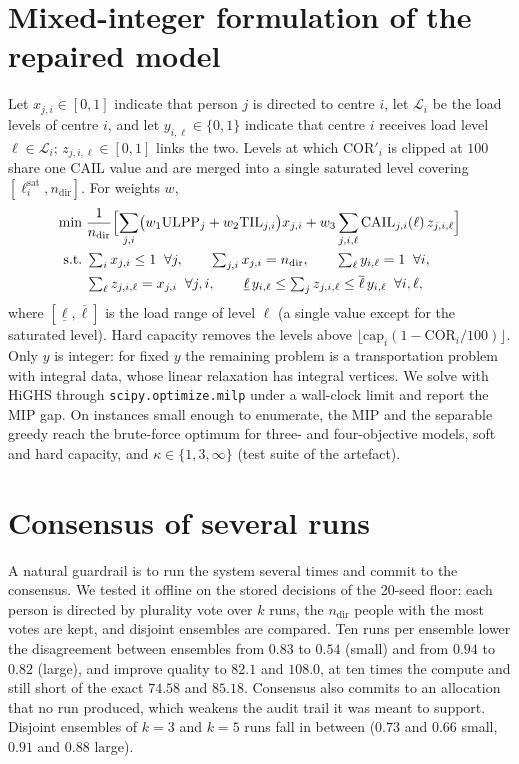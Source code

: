 \documentclass[systems,article,submit,moreauthors,pdftex]{Definitions/mdpi}
\begin{document}
\section{Mixed-integer formulation of the repaired model}\label{app:mip}
Let $x_{j,i} \in [0,1]$ indicate that person $j$ is directed to centre $i$, let
$\mathcal{L}_i$ be the load levels of centre $i$, and let $y_{i,\ell} \in \{0,1\}$ indicate
that centre $i$ receives load level $\ell \in \mathcal{L}_i$; $z_{j,i,\ell} \in [0,1]$ links
the two. Levels at which $\mathrm{COR}'_i$ is clipped at $100$ share one CAIL value and are
merged into a single saturated level covering $[\ell^{\mathrm{sat}}_i, n_{\mathrm{dir}}]$.
For weights $w$,
\begin{align}
\min\; & \frac{1}{n_{\mathrm{dir}}}\Bigl[\sum_{j,i} \bigl(w_1\mathrm{ULPP}_j + w_2\mathrm{TIL}_{j,i}\bigr)x_{j,i}
 + w_3 \sum_{j,i,\ell} \mathrm{CAIL}_{j,i}(\ell)\, z_{j,i,\ell}\Bigr] \\
\text{s.t.}\; & \textstyle\sum_i x_{j,i} \le 1 \;\; \forall j, \qquad \sum_{j,i} x_{j,i} = n_{\mathrm{dir}},
 \qquad \sum_{\ell} y_{i,\ell} = 1 \;\; \forall i,\\
& \textstyle\sum_{\ell} z_{j,i,\ell} = x_{j,i} \;\; \forall j,i, \qquad
 \underline{\ell}\, y_{i,\ell} \le \sum_j z_{j,i,\ell} \le \overline{\ell}\, y_{i,\ell} \;\; \forall i,\ell,
\end{align}
where $[\underline{\ell}, \overline{\ell}]$ is the load range of level $\ell$ (a single value
except for the saturated level). Hard capacity removes the levels above
$\lfloor \mathrm{cap}_i (1 - \mathrm{COR}_i/100)\rfloor$. Only $y$ is integer: for fixed $y$
the remaining problem is a transportation problem with integral data, whose linear relaxation
has integral vertices. We solve with HiGHS through \texttt{scipy.optimize.milp} under a
wall-clock limit and report the MIP gap. On instances small enough to enumerate, the MIP and
the separable greedy reach the brute-force optimum for three- and four-objective models, soft
and hard capacity, and $\kappa \in \{1, 3, \infty\}$ (test suite of the artefact).

\section{Consensus of several runs}\label{app:consensus}
A natural guardrail is to run the system several times and commit to the consensus. We
tested it offline on the stored decisions of the 20-seed floor: each person is directed by plurality vote over $k$ runs,
the $n_{\mathrm{dir}}$ people with the most votes are kept, and disjoint ensembles are
compared. Ten runs per ensemble lower the disagreement between ensembles from $0.83$ to $0.54$
(small) and from $0.94$ to $0.82$ (large), and improve quality to $82.1$ and $108.0$, at ten
times the compute and still short of the exact $74.58$ and $85.18$. Consensus also commits
to an allocation that no run produced, which weakens the audit trail it was meant to support. Disjoint ensembles of $k=3$ and $k=5$ runs fall in between
($0.73$ and $0.66$ small, $0.91$ and $0.88$ large).
\end{document}
